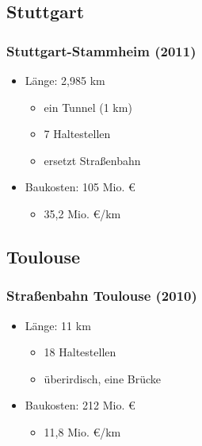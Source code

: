 \documentclass[xcolor=dvipsnames]{beamer}
\begin{document}

\subsection{Stuttgart}
\begin{frame}
  \frametitle{Stuttgart-Stammheim (2011)}

  \begin{itemize}
  \item Länge: 2,985 km
    \begin{itemize}
    \item ein Tunnel (1 km)
    \item 7 Haltestellen
    \item ersetzt Straßenbahn
    \end{itemize}
  \item Baukosten: 105 Mio. €
    \begin{itemize}
    \item 35,2 Mio. €/km
    \end{itemize}
  \end{itemize}
\end{frame}


\subsection{Toulouse}
\begin{frame}
  \frametitle{Straßenbahn Toulouse (2010)}

  \begin{itemize}
  \item Länge: 11 km
    \begin{itemize}
    \item 18 Haltestellen
    \item überirdisch, eine Brücke
    \end{itemize}
  \item Baukosten: 212 Mio. €
    \begin{itemize}
    \item 11,8 Mio. €/km
    \end{itemize}
  \end{itemize}
\end{frame}

\end{document}
